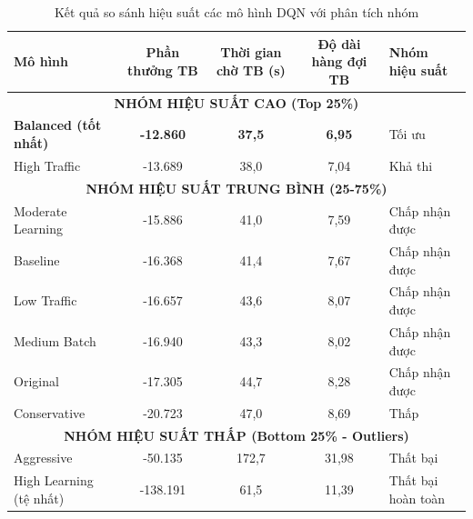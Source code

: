 \begin{table}[!htp]
    \centering
    \caption{Kết quả so sánh hiệu suất các mô hình DQN với phân tích nhóm}
    \label{tab:model_performance_comparison}
    \footnotesize
    \begin{tabular}{|l|c|c|c|l|}
        \hline 
        \textbf{Mô hình}  & \textbf{Phần thưởng TB} & \textbf{Thời gian chờ TB (s)} & \textbf{Độ dài hàng đợi TB} & \textbf{Nhóm hiệu suất} \\
        \hline 
        \multicolumn{5}{|c|}{\textbf{NHÓM HIỆU SUẤT CAO (Top 25\%)}} \\
        \hline
        \textbf{Balanced (tốt nhất)} & \textbf{-12.860}     & \textbf{37,5}            & \textbf{6,95}               & Tối ưu \\
        \hline
        High Traffic               & -13.689              & 38,0                     & 7,04                        & Khả thi \\
        \hline
        \multicolumn{5}{|c|}{\textbf{NHÓM HIỆU SUẤT TRUNG BÌNH (25-75\%)}} \\
        \hline
        Moderate Learning          & -15.886              & 41,0                     & 7,59                        & Chấp nhận được \\
        \hline
        Baseline                   & -16.368              & 41,4                     & 7,67                        & Chấp nhận được \\
        \hline
        Low Traffic                & -16.657              & 43,6                     & 8,07                        & Chấp nhận được \\
        \hline
        Medium Batch               & -16.940              & 43,3                     & 8,02                        & Chấp nhận được \\
        \hline
        Original                   & -17.305              & 44,7                     & 8,28                        & Chấp nhận được \\
        \hline
        Conservative               & -20.723              & 47,0                     & 8,69                        & Thấp \\
        \hline
        \multicolumn{5}{|c|}{\textbf{NHÓM HIỆU SUẤT THẤP (Bottom 25\% - Outliers)}} \\
        \hline
        Aggressive                 & -50.135              & 172,7                    & 31,98                       & Thất bại \\
        \hline
        High Learning (tệ nhất)              & -138.191             & 61,5                     & 11,39                       & Thất bại hoàn toàn \\
        \hline
    \end{tabular}
\end{table}

